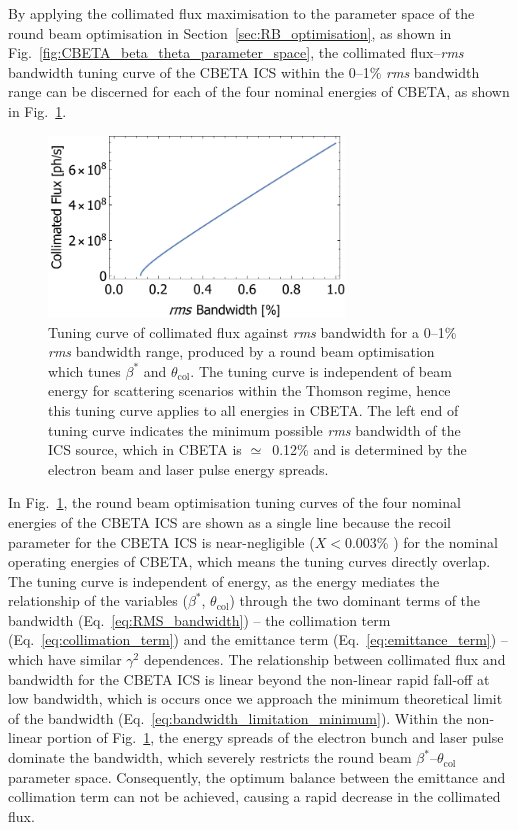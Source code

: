 \documentclass[../main.tex]{subfiles}
\begin{document}
By applying the collimated flux maximisation to the parameter space of the round beam optimisation in Section~\ref{sec:RB_optimisation}, as shown in Fig.~\ref{fig:CBETA_beta_theta_parameter_space}, the collimated flux--\textit{rms} bandwidth tuning curve of the CBETA ICS within the 0--1\% \textit{rms} bandwidth range can be discerned for each of the four nominal energies of CBETA, as shown in Fig.~\ref{fig:CBETA_Tuning_Curve}. 

\begin{figure}[!h]
\centering
\includegraphics[width=0.7\textwidth]{Figures/CBETA_Inverse_Compton_Source_Design/CBETA150_RB_Fcol_BW.pdf}
\caption{Tuning curve of collimated flux against \textit{rms} bandwidth for a 0--1\% \textit{rms} bandwidth range, produced by a round beam optimisation which tunes $\beta^{*}$ and $\theta_{\mathrm{col}}$. The tuning curve is independent of beam energy for scattering scenarios within the Thomson regime, hence this tuning curve applies to all energies in CBETA. The left end of tuning curve indicates the minimum possible \textit{rms} bandwidth of the ICS source, which in CBETA is $\simeq$~0.12\% and is determined by the electron beam and laser pulse energy spreads.}
\label{fig:CBETA_Tuning_Curve}
\end{figure}

In Fig.~\ref{fig:CBETA_Tuning_Curve}, the round beam optimisation tuning curves of the four nominal energies of the CBETA ICS are shown as a single line because the recoil parameter for the CBETA ICS is near-negligible ($X<0.003$\% ) for the nominal operating energies of CBETA, which means the tuning curves directly overlap. The tuning curve is independent of energy, as the energy mediates the relationship of the variables ($\beta^{*}$, $\theta_{\mathrm{col}}$) through the two dominant terms of the bandwidth (Eq.~\ref{eq:RMS_bandwidth}) -- the collimation term (Eq.~\ref{eq:collimation_term}) and the emittance term (Eq.~\ref{eq:emittance_term}) -- which have similar $\gamma^{2}$ dependences. The relationship between collimated flux and bandwidth for the CBETA ICS is linear beyond the non-linear rapid fall-off at low bandwidth, which is occurs once we approach the minimum theoretical limit of the bandwidth (Eq.~\ref{eq:bandwidth_limitation_minimum}). Within the non-linear portion of Fig.~\ref{fig:CBETA_Tuning_Curve}, the energy spreads of the electron bunch and laser pulse dominate the bandwidth, which severely restricts the round beam $\beta^{*}$--$\theta_{\mathrm{col}}$ parameter space. Consequently, the optimum balance between the emittance and collimation term can not be achieved, causing a rapid decrease in the collimated flux.
\end{document}
